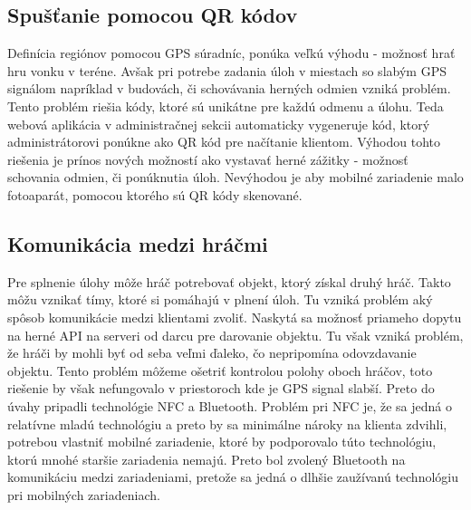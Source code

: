 \subsection{Spušťanie pomocou QR kódov}

Definícia regiónov pomocou GPS súradníc, ponúka veľkú výhodu - možnosť hrať hru vonku v teréne. Avšak pri potrebe zadania úloh v miestach so slabým GPS signálom napríklad v budovách, či schovávania herných odmien vzniká problém. Tento problém riešia kódy, ktoré sú unikátne pre každú odmenu a úlohu. Teda webová aplikácia v administračnej sekcii automaticky vygeneruje kód, ktorý administrátorovi ponúkne ako QR kód pre načítanie klientom. Výhodou tohto riešenia je prínos nových možností ako vystavať herné zážitky - možnosť schovania odmien, či ponúknutia úloh. Nevýhodou je aby mobilné zariadenie malo fotoaparát, pomocou ktorého sú QR kódy skenované.

\subsection{Komunikácia medzi hráčmi}
Pre splnenie úlohy môže hráč potrebovať objekt, ktorý získal druhý hráč. Takto môžu vznikať tímy, ktoré si pomáhajú v plnení úloh. Tu vzniká problém aký spôsob komunikácie medzi klientami zvoliť. Naskytá sa možnosť priameho dopytu na herné API na serveri od darcu pre darovanie objektu. Tu však vzniká problém, že hráči by mohli byť od seba veľmi ďaleko, čo nepripomína odovzdavanie objektu. Tento problém môžeme ošetriť kontrolou polohy oboch hráčov, toto riešenie by však nefungovalo v priestoroch kde je GPS signal slabší. Preto do úvahy pripadli technológie NFC a Bluetooth. Problém pri NFC je, že sa jedná o relatívne mladú technológiu a preto by sa minimálne nároky na klienta zdvihli, potrebou vlastniť mobilné zariadenie, ktoré by podporovalo túto technológiu, ktorú mnohé staršie zariadenia nemajú. Preto bol zvolený Bluetooth na komunikáciu medzi zariadeniami, pretože sa jedná o dlhšie zaužívanú technológiu pri mobilných zariadeniach.



